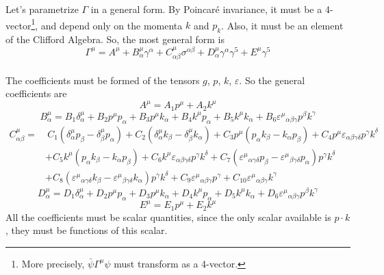 \documentclass{article}
\begin{document}
Let's parametrize $\Gamma$ in a general form. By Poincaré invariance, it must be a 4-vector\footnote{More precisely, $\bar{\psi}\Gamma^\mu \psi$ must transform as a 4-vector.}, and depend only on the momenta $k$ and $p_k$. Also, it must be an element of the Clifford Algebra. So, the most general form is
\begin{equation}
	\Gamma^\mu = A^\mu + B^{\mu}_{\alpha} \gamma^\alpha + C^{\mu}_{\alpha\beta} \sigma^{\alpha\beta} + D^{\mu}_{\alpha} \gamma^\alpha \gamma^5 + E^\mu \gamma^5
\end{equation}
\\
The coefficients must be formed of the tensors $g$, $p$, $k$, $\varepsilon$. So the general coefficients are
\begin{equation}
	A^\mu = A_1 p^\mu + A_2 k^\mu
\end{equation}
\begin{equation}
	B^\mu_\alpha = B_1\delta^\mu_\alpha + B_2 p^\mu p_\alpha + B_3 p^\mu k_\alpha + B_4 k^\mu p_\alpha + B_5 k^\mu k_\alpha + B_6 \varepsilon^\mu{}_{\alpha\beta\gamma}p^\beta k^\gamma
\end{equation}
\begin{align*}
	C^\mu_{\alpha\beta} =&\ C_1(\delta^\mu_\alpha p_\beta - \delta^\mu_\beta p_\alpha) + C_2(\delta^\mu_\alpha k_\beta - \delta^\mu_\beta k_\alpha) + C_3p^\mu(p_\alpha k_\beta - k_\alpha p_\beta)
	+ C_{4}p^\mu \varepsilon_{\alpha\beta\gamma\delta}p^\gamma k^\delta\\&
	+ C_{5}k^\mu (p_\alpha k_\beta - k_\alpha p_\beta) + C_{6}k^\mu \varepsilon_{\alpha\beta\gamma\delta}p^\gamma k^\delta
	+ C_{7}(\varepsilon^\mu{}_{\alpha\gamma\delta}p_\beta - \varepsilon^\mu{}_{\beta\gamma\delta}p_\alpha) p^\gamma k^\delta\\&
	+ C_{8}(\varepsilon^\mu{}_{\alpha\gamma\delta}k_\beta - \varepsilon^\mu{}_{\beta\gamma\delta}k_\alpha) p^\gamma k^\delta + C_{9}\varepsilon^\mu{}_{\alpha\beta\gamma}p^\gamma + C_{10}\varepsilon^\mu{}_{\alpha\beta\gamma}k^\gamma
\end{align*}
\begin{equation}
	D^\mu_\alpha = D_1\delta^\mu_\alpha + D_2 p^\mu p_\alpha + D_3 p^\mu k_\alpha + D_4 k^\mu p_\alpha + D_5 k^\mu k_\alpha + D_6 \varepsilon^\mu{}_{\alpha\beta\gamma}p^\beta k^\gamma
\end{equation}
\begin{equation}
	E^\mu = E_1 p^\mu + E_2 k^\mu
\end{equation}
All the coefficients must be scalar quantities, since the only scalar available is $p\cdot k$, they must be functions of this scalar.
\end{document}
